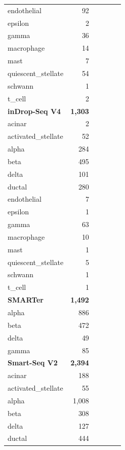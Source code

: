 \documentclass[11pt, a4paper]{article}
\begin{document}
\begin{xltabular}{\textwidth}{>{\raggedright\arraybackslash}X r >{\raggedright\arraybackslash}X r >{\raggedright\arraybackslash}X r}
\quad endothelial & 92 &  &  &  &  \\
\quad epsilon & 2 &  &  &  &  \\
\quad gamma & 36 &  &  &  &  \\
\quad macrophage & 14 &  &  &  &  \\
\quad mast & 7 &  &  &  &  \\
\quad quiescent\_stellate & 54 &  &  &  &  \\
\quad schwann & 1 &  &  &  &  \\
\quad t\_cell & 2 &  &  &  &  \\
\textbf{inDrop-Seq V4} & \textbf{1,303} &  &  &  &  \\
\quad acinar & 2 &  &  &  &  \\
\quad activated\_stellate & 52 &  &  &  &  \\
\quad alpha & 284 &  &  &  &  \\
\quad beta & 495 &  &  &  &  \\
\quad delta & 101 &  &  &  &  \\
\quad ductal & 280 &  &  &  &  \\
\quad endothelial & 7 &  &  &  &  \\
\quad epsilon & 1 &  &  &  &  \\
\quad gamma & 63 &  &  &  &  \\
\quad macrophage & 10 &  &  &  &  \\
\quad mast & 1 &  &  &  &  \\
\quad quiescent\_stellate & 5 &  &  &  &  \\
\quad schwann & 1 &  &  &  &  \\
\quad t\_cell & 1 &  &  &  &  \\
\textbf{SMARTer} & \textbf{1,492} &  &  &  &  \\
\quad alpha & 886 &  &  &  &  \\
\quad beta & 472 &  &  &  &  \\
\quad delta & 49 &  &  &  &  \\
\quad gamma & 85 &  &  &  &  \\
\textbf{Smart-Seq V2} & \textbf{2,394} &  &  &  &  \\
\quad acinar & 188 &  &  &  &  \\
\quad activated\_stellate & 55 &  &  &  &  \\
\quad alpha & 1,008 &  &  &  &  \\
\quad beta & 308 &  &  &  &  \\
\quad delta & 127 &  &  &  &  \\
\quad ductal & 444 &  &  &  &  \\

\end{xltabular}
\end{document}
